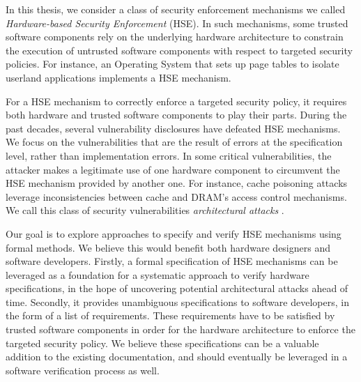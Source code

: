 In this thesis, we consider a class of security enforcement mechanisms we called
\emph{Hardware-based Security Enforcement} (HSE).
%
In such mechanisms, some trusted software components rely on the underlying
hardware architecture to constrain the execution of untrusted software
components with respect to targeted security policies.
%
For instance, an Operating System that sets up page tables to isolate userland
applications implements a HSE mechanism.

For a HSE mechanism to correctly enforce a targeted security policy, it requires
both hardware and trusted software components to play their parts.
%
During the past decades, several vulnerability disclosures have defeated HSE
mechanisms.
%
We focus on the vulnerabilities that are the result of errors at the
specification level, rather than implementation errors.
%
In some critical vulnerabilities, the attacker makes a legitimate use of one
hardware component to circumvent the HSE mechanism provided by another one.
%
For instance, cache poisoning attacks leverage inconsistencies between cache
and DRAM's access control mechanisms.
%
We call this class of security vulnerabilities \emph{architectural attacks} .

Our goal is to explore approaches to specify and verify HSE mechanisms using
formal methods.
%
We believe this would benefit both hardware designers and software developers.
%
Firstly, a formal specification of HSE mechanisms can be leveraged as a
foundation for a systematic approach to verify hardware specifications, in the
hope of uncovering potential architectural attacks ahead of time.
%
Secondly, it provides unambiguous specifications to software developers, in the
form of a list of requirements.
%
These requirements have to be satisfied by trusted software components in order
for the hardware architecture to enforce the targeted security policy.
%
We believe these specifications can be a valuable addition to the existing
documentation, and should eventually be leveraged in a software verification
process as well. 

